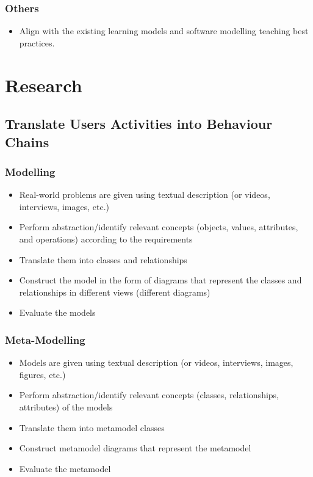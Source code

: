 \documentclass[12pt, a4paper]{report}
\begin{document}
\begin{appendices}
\subsubsection{Others}
\begin{itemize}
\item Align with the existing learning models and software modelling teaching best practices.
\end{itemize}

\section{Research}
\subsection{Translate Users Activities into Behaviour Chains}
\subsubsection{Modelling}
\begin{itemize}
\item Real-world problems are given using textual description (or videos, interviews, images, etc.) 
\item Perform abstraction/identify relevant concepts (objects, values, attributes, and operations) according to the requirements 
\item Translate them into classes and relationships
\item Construct the model in the form of diagrams that represent the classes and relationships in different views (different diagrams)
\item Evaluate the models
\end{itemize}

\subsubsection{Meta-Modelling}
\begin{itemize}
\item Models are given using textual description (or videos, interviews, images, figures, etc.) 
\item Perform abstraction/identify relevant concepts (classes, relationships, attributes) of the models
\item Translate them into metamodel classes
\item Construct metamodel diagrams that represent the metamodel
\item Evaluate the metamodel
\end{itemize}


\end{appendices}
\end{document}
